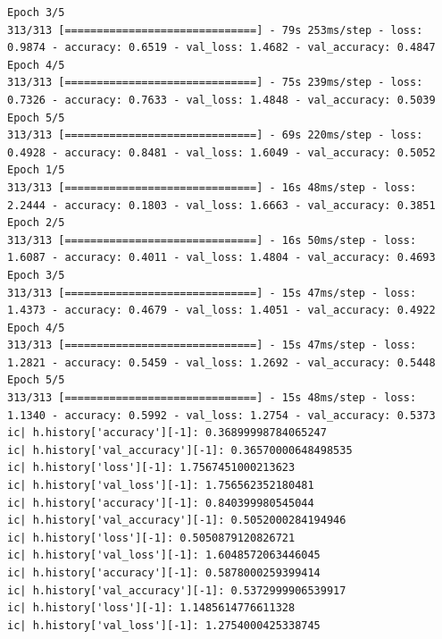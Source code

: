 \documentclass{tron}
\begin{document}
\begin{lstlisting}[style=mystyle:output]
Epoch 3/5
313/313 [==============================] - 79s 253ms/step - loss: 0.9874 - accuracy: 0.6519 - val_loss: 1.4682 - val_accuracy: 0.4847
Epoch 4/5
313/313 [==============================] - 75s 239ms/step - loss: 0.7326 - accuracy: 0.7633 - val_loss: 1.4848 - val_accuracy: 0.5039
Epoch 5/5
313/313 [==============================] - 69s 220ms/step - loss: 0.4928 - accuracy: 0.8481 - val_loss: 1.6049 - val_accuracy: 0.5052
Epoch 1/5
313/313 [==============================] - 16s 48ms/step - loss: 2.2444 - accuracy: 0.1803 - val_loss: 1.6663 - val_accuracy: 0.3851
Epoch 2/5
313/313 [==============================] - 16s 50ms/step - loss: 1.6087 - accuracy: 0.4011 - val_loss: 1.4804 - val_accuracy: 0.4693
Epoch 3/5
313/313 [==============================] - 15s 47ms/step - loss: 1.4373 - accuracy: 0.4679 - val_loss: 1.4051 - val_accuracy: 0.4922
Epoch 4/5
313/313 [==============================] - 15s 47ms/step - loss: 1.2821 - accuracy: 0.5459 - val_loss: 1.2692 - val_accuracy: 0.5448
Epoch 5/5
313/313 [==============================] - 15s 48ms/step - loss: 1.1340 - accuracy: 0.5992 - val_loss: 1.2754 - val_accuracy: 0.5373
ic| h.history['accuracy'][-1]: 0.36899998784065247
ic| h.history['val_accuracy'][-1]: 0.36570000648498535
ic| h.history['loss'][-1]: 1.7567451000213623
ic| h.history['val_loss'][-1]: 1.756562352180481
ic| h.history['accuracy'][-1]: 0.840399980545044
ic| h.history['val_accuracy'][-1]: 0.5052000284194946
ic| h.history['loss'][-1]: 0.5050879120826721
ic| h.history['val_loss'][-1]: 1.6048572063446045
ic| h.history['accuracy'][-1]: 0.5878000259399414
ic| h.history['val_accuracy'][-1]: 0.5372999906539917
ic| h.history['loss'][-1]: 1.1485614776611328
ic| h.history['val_loss'][-1]: 1.2754000425338745
\end{lstlisting}


\end{document}

